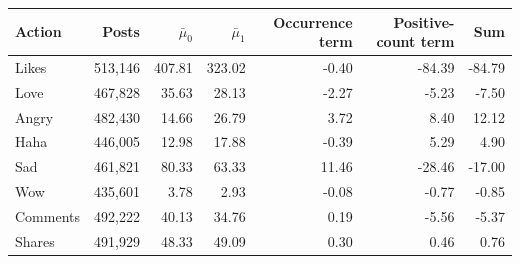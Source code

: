 \begin{tabular}{lrrrrrr}
\toprule
Action & Posts & $\bar\mu_0$ & $\bar\mu_1$ & Occurrence term & Positive-count term & Sum \\
\midrule
Likes & 513,146 & 407.81 & 323.02 & -0.40 & -84.39 & -84.79 \\
Love & 467,828 & 35.63 & 28.13 & -2.27 & -5.23 & -7.50 \\
Angry & 482,430 & 14.66 & 26.79 & 3.72 & 8.40 & 12.12 \\
Haha & 446,005 & 12.98 & 17.88 & -0.39 & 5.29 & 4.90 \\
Sad & 461,821 & 80.33 & 63.33 & 11.46 & -28.46 & -17.00 \\
Wow & 435,601 & 3.78 & 2.93 & -0.08 & -0.77 & -0.85 \\
Comments & 492,222 & 40.13 & 34.76 & 0.19 & -5.56 & -5.37 \\
Shares & 491,929 & 48.33 & 49.09 & 0.30 & 0.46 & 0.76 \\
\bottomrule
\end{tabular}
